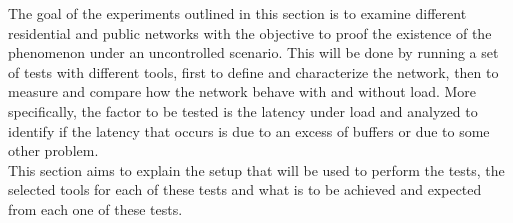The goal of the experiments outlined in this section is to examine different
residential and public networks with the objective to proof the existence of the
phenomenon under an uncontrolled scenario. This will be done by running a set of
tests with different tools, first to define and characterize the network, then
to measure and compare how the network behave with and without load. More
specifically, the factor to be tested is the latency under load and analyzed to
identify if the latency that occurs is due to an excess of buffers or due to
some other problem.\\

This section aims to explain the setup that will be used to perform the tests,
the selected tools for each of these tests and what is to be achieved and 
expected from each one of these tests.\\
